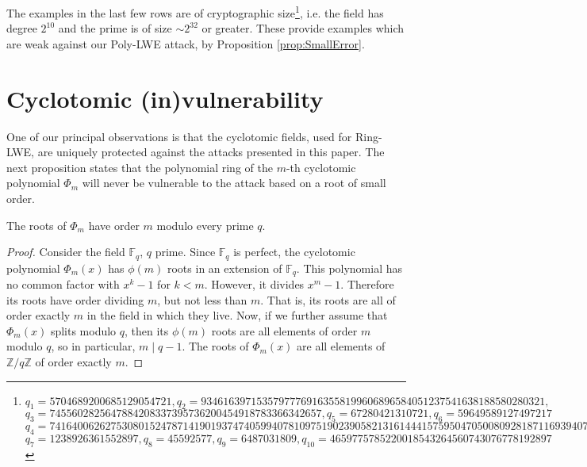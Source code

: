 \documentclass{llncs}
\newcommand{\FF}{\mathbb{F}}
\newcommand{\ZZ}{\mathbb{Z}}
\newcommand{\<}{\langle}
\renewcommand{\>}{\rangle}
\begin{document}
\normalsize
The examples in the last few rows are of cryptographic size\footnote{ {$q_1=  5704689200685129054721, q_2= 93461639715357977769163558199606896584051237541638188580280321,$} \\
$ {q_3=7455602825647884208337395736200454918783366342657, q_5= 67280421310721, q_6= 59649589127497217}$\\
${q_4=  741640062627530801524787141901937474059940781097519023905821316144415759504705008092818711693940737}$\\
${q_7=1238926361552897, q_8=45592577, q_9=6487031809, q_{10}=4659775785220018543264560743076778192897 }$}, i.e. the field has degree $2^{10}$ and the prime is of size $\sim 2^{32}$ or greater.  These provide examples which are weak against our Poly-LWE attack, by Proposition \ref{prop:SmallError}.








\section{Cyclotomic (in)vulnerability}
\label{sec:cyc}

One of our principal observations is that the cyclotomic fields, used for Ring-LWE, are uniquely protected against the attacks presented in this paper.  The next proposition states that the polynomial ring of the $m$-th cyclotomic polynomial $\Phi_m$ will never be vulnerable to the attack based on a root of small order.

\begin{proposition} The roots of $\Phi_m$ have order $m$ modulo every prime $q$.
\end{proposition}

\begin{proof}
Consider the field $\FF_q$, $q$ prime.  Since $\FF_q$ is perfect, the cyclotomic polynomial $\Phi_m(x)$ has $\phi(m)$ roots in an extension of $\FF_q$.  This polynomial has no common factor with $x^k-1$ for $k < m$.  However, it divides $x^m-1$.  Therefore its roots have order dividing $m$, but not less than $m$.  That is, its roots are all of order exactly $m$ in the field in which they live.  Now, if we further assume that $\Phi_m(x)$ splits modulo $q$, then its $\phi(m)$ roots are all elements of order $m$ modulo $q$, so in particular, $m \mid q-1$.  The roots of $\Phi_m(x)$ are all elements of $\ZZ/q\ZZ$ of order exactly $m$.
\end{proof}
\end{document}
